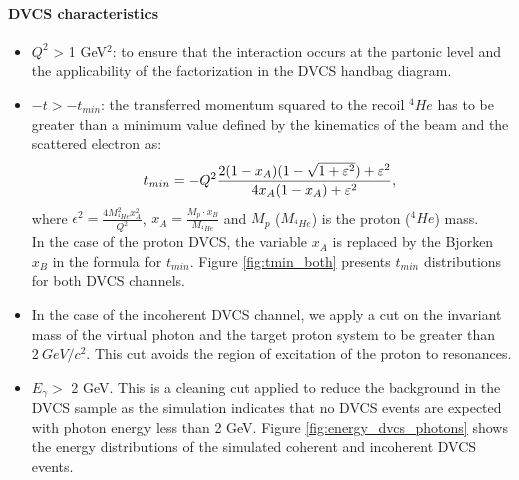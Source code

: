 \paragraph{DVCS characteristics}
\begin{itemize}
 \item $Q^{2}$ > 1 GeV$^{2}$: to ensure that the interaction occurs at the 
    partonic level and the applicability of the factorization in the DVCS  
    handbag diagram.
\item $ -t > -t_{min}$: the transferred momentum squared to the recoil $^{4}He$ 
   has to be greater than a minimum value defined by the kinematics of the beam 
   and the scattered electron as:
\begin{equation}
   t_{min} = - Q^{2} \frac{2(1- x_{A})(1 - \sqrt{1 + \epsilon ^{2}}) + \epsilon 
   ^{2}}{4 x_{A}(1-x_{A})+ \epsilon ^{2}},\\
\end{equation}
where $\epsilon ^{2} = \frac{4M^{2}_{^4He}x^{2}_{A}}{Q^{2}}$, $x_{A} = 
\frac{M_{p}\cdot x_{B}}{M_{^4He}}$ and $M_{p}$ ($M_{^4He}$) is the proton 
($^{4}He$) mass.\\

In the case of the proton DVCS, the variable $x_{A}$ is replaced by the Bjorken 
$x_{B}$ in the formula for $t_{min}$. Figure \ref{fig:tmin_both} presents 
$t_{min}$ distributions for both DVCS channels.

\item In the case of the incoherent DVCS channel, we apply a cut on the 
   invariant mass of the virtual photon and the target proton system to be
   greater than $2~GeV/c{^2}$. This cut avoids the region of excitation of the 
   proton to resonances.
 
\item $E_{\gamma}>$ 2 GeV. This is a cleaning cut applied to reduce the 
   background in the DVCS sample as the simulation indicates that no DVCS 
   events are expected with photon energy less than 2 GeV. Figure 
   \ref{fig:energy_dvcs_photons} shows the energy distributions of the 
   simulated coherent and incoherent DVCS events.


\end{itemize}
